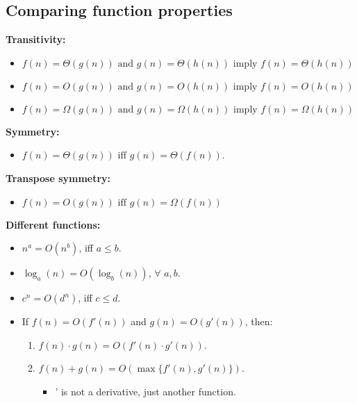 \documentclass{article}
\begin{document}
\subsection{Comparing function properties}
\begin{definition}
    
    \textbf{Transitivity:}
    \begin{itemize}
        \item $f(n) = \Theta(g(n)) \text{ and } g(n)=\Theta(h(n)) \text{ imply } f(n) = \Theta(h(n))$
        \item $f(n) = O(g(n)) \text{ and } g(n)=O(h(n)) \text{ imply } f(n) = O(h(n))$
        \item $f(n) = \Omega(g(n)) \text{ and } g(n)=\Omega(h(n)) \text{ imply } f(n) = \Omega(h(n))$
    \end{itemize}
    \vspace{1em}

    \textbf{Symmetry:}
    \begin{itemize}
        \item $f(n) = \Theta(g(n)) \text{ iff } g(n) = \Theta(f(n))$.
    \end{itemize}
    \vspace{1em}

    \textbf{Transpose symmetry:}
    \begin{itemize}
        \item $f(n) = O(g(n)) \text{ iff } g(n) = \Omega(f(n))$
    \end{itemize}
    \vspace{1em}

    \textbf{Different functions:}
    \begin{itemize}
        \item \( n^a = O(n^b) \), iff \( a \leq b \).
        \item \( \log_a(n) = O(\log_b(n)) \), $\forall$ \( a, b \).
        \item \( c^n = O(d^n) \), iff \( c \leq d \).
        \item If \( f(n) = O(f'(n)) \) and \( g(n) = O(g'(n)) \), then:
        \begin{enumerate}
            \item \( f(n) \cdot g(n) = O(f'(n) \cdot g'(n)) \).
            \item \( f(n) + g(n) = O(\max\{f'(n), g'(n)\}) \).
            \begin{itemize}
                \item ' is not a derivative, just another function. 
            \end{itemize}
        \end{enumerate}
    \end{itemize}
    
\end{definition}
\end{document}
